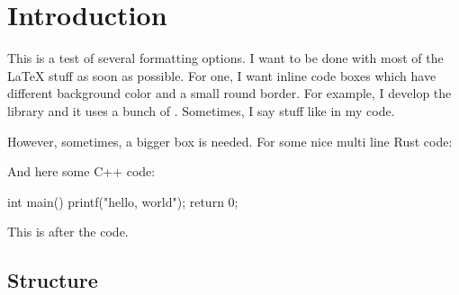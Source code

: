 \chapter{Introduction}

This is a test of several formatting options. I want to be done with most of the LaTeX stuff as soon as possible. For one, I want inline code boxes which have different background color and a small round border. For example, I develop the library  and it uses a bunch of . Sometimes, I say stuff like  in my code.

However, sometimes, a bigger box is needed. For some nice multi line Rust code:


And here some C++ code:

\begin{cppcode}
int main() {
printf("hello, world");
return 0;
}
\end{cppcode}

This is after the code.

\section{Structure}

\blindtext
